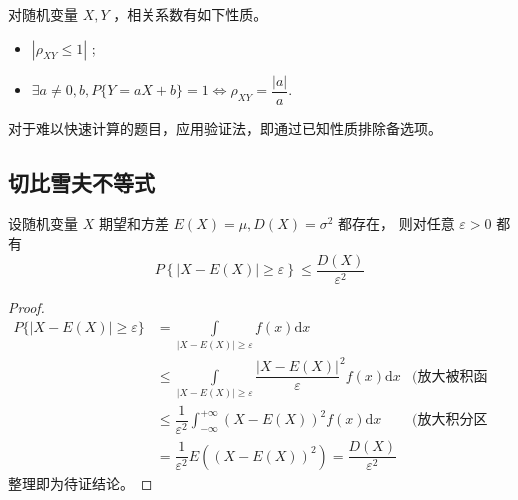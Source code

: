 对随机变量 $ X,Y $ ，相关系数有如下性质。
\begin{itemize}
    \item $ |\rho_{XY} \leq 1| $ ;
    \item $ \exists a\neq0,b,P\{Y = aX+b\} = 1 \Leftrightarrow \rho_{XY} = \dfrac{|a|}{a} $.
\end{itemize}


对于难以快速计算的题目，应用验证法，即通过已知性质排除备选项。

\subsection{切比雪夫不等式}

\begin{Theo}[切比雪夫不等式]

    设随机变量 $ X $ 期望和方差 $ E(X) = \mu,D(X) = \sigma^2 $ 都存在，
    则对任意 $ \varepsilon > 0 $ 都有 $$
        P\left\{|X-E(X)|\geq \varepsilon\right\} \leq \dfrac{D(X)}{\varepsilon^2}
    $$ 
\end{Theo}

\begin{proof}
    \begin{equation*}
        \begin{aligned}
            P\{|X-E(X)|\geq \varepsilon\} &= \int\limits_{|X-E(X)|\geq\varepsilon}f(x)\mathrm{d}x&
            \\&\leq\int\limits_{|X-E(X)|\geq\varepsilon}\dfrac{|X-E(X)|}{\varepsilon}^2f(x)\mathrm{d}x
            &\textrm{(放大被积函数)}\\&\leq
            \dfrac{1}{\varepsilon^2}\int_{-\infty}^{+\infty}(X-E(X))^2f(x)\mathrm{d}x&
            \textrm{(放大积分区间)}\\&=\dfrac{1}{\varepsilon^2}E((X-E(X))^2)
            =\dfrac{D(X)}{\varepsilon^2}
        \end{aligned}
    \end{equation*}
    整理即为待证结论。
\end{proof}